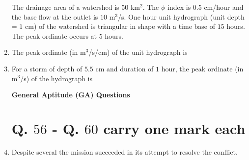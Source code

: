\documentclass[journal]{IEEEtran}
\begin{document}
\begin{enumerate}
The drainage area of a watershed is 50 km$^{2}$. The $\phi$ index is $0.5$ cm/hour and the base flow at the outlet is
$10$ m$^3$/s. One hour unit hydrograph (unit depth = $1$ cm) of the watershed is triangular in shape with a time base of $15$ hours. The peak ordinate occurs at $5$ hours.

\item The peak ordinate (in m$^{3}$/s/cm) of the unit hydrograph is \hfill {}
\begin{enumerate}
\end{enumerate}

\item For a storm of depth of $5.5$ cm and duration of $1$ hour, the peak ordinate (in m$^{3}$/s) of the hydrograph is \hfill {}
\begin{enumerate}
\end{enumerate}

\textbf{General Aptitude (GA) Questions}
\section*{Q. $56$ - Q. $60$ carry one mark each}

\item Despite several \underline{\hspace{1.7cm}} the mission succeeded in its attempt to resolve the conflict. \hfill {}
\begin{enumerate}
\end{enumerate}


\end{enumerate}
\end{document}
